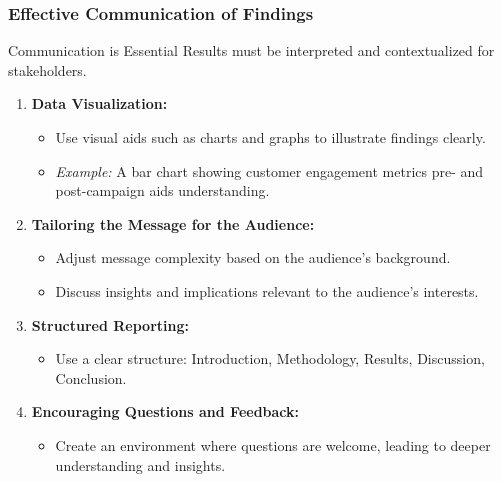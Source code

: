 \documentclass[aspectratio=169]{beamer}
\begin{document}
\begin{frame}[fragile]
    \frametitle{Effective Communication of Findings}
    \begin{block}{Communication is Essential}
        Results must be interpreted and contextualized for stakeholders.
    \end{block}
    \begin{enumerate}
        \item \textbf{Data Visualization:}
        \begin{itemize}
            \item Use visual aids such as charts and graphs to illustrate findings clearly.
            \item \textit{Example:} A bar chart showing customer engagement metrics pre- and post-campaign aids understanding.
        \end{itemize}
        
        \item \textbf{Tailoring the Message for the Audience:}
        \begin{itemize}
            \item Adjust message complexity based on the audience’s background.
            \item Discuss insights and implications relevant to the audience's interests.
        \end{itemize}

        \item \textbf{Structured Reporting:}
        \begin{itemize}
            \item Use a clear structure: Introduction, Methodology, Results, Discussion, Conclusion.
        \end{itemize}

        \item \textbf{Encouraging Questions and Feedback:}
        \begin{itemize}
            \item Create an environment where questions are welcome, leading to deeper understanding and insights.
        \end{itemize}
    \end{enumerate}
\end{frame}
\end{document}

